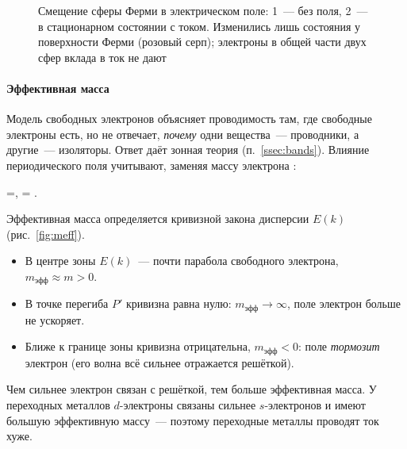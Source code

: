 \begin{figure}[ht]
\centering
{}
\caption{Смещение сферы Ферми в электрическом поле: 1~— без поля,
2~— в стационарном состоянии с током. Изменились лишь состояния у
поверхности Ферми (розовый серп); электроны в общей части двух сфер
вклада в ток не дают}
\label{fig:fermi-shift}
\end{figure}

\paragraph{Эффективная масса}
Модель свободных электронов объясняет проводимость там, где свободные
электроны есть, но не отвечает, \emph{почему} одни вещества~—
проводники, а другие~— изоляторы. Ответ даёт зонная теория
(п.~\ref{ssec:bands}). Влияние периодического поля учитывают, заменяя
массу электрона :
\begin{keyeq}\label{eq:meff}
=,\qquad
\sigma= .
\end{keyeq}
Эффективная масса определяется кривизной закона дисперсии $E(k)$
(рис.~\ref{fig:meff}).
\begin{itemize}
\item В центре зоны $E(k)$~— почти парабола свободного электрона,
$m_\text{эфф}\approx m>0$.
\item В точке перегиба $P'$ кривизна равна нулю: $m_\text{эфф}\to\infty$,
поле электрон больше не ускоряет.
\item Ближе к границе зоны кривизна отрицательна, $m_\text{эфф}<0$: поле
\emph{тормозит} электрон (его волна всё сильнее отражается решёткой).
\end{itemize}
Чем сильнее электрон связан с решёткой, тем больше эффективная масса.
У переходных металлов $d$-электроны связаны сильнее $s$-электронов и
имеют большую эффективную массу~— поэтому переходные металлы проводят
ток хуже.

